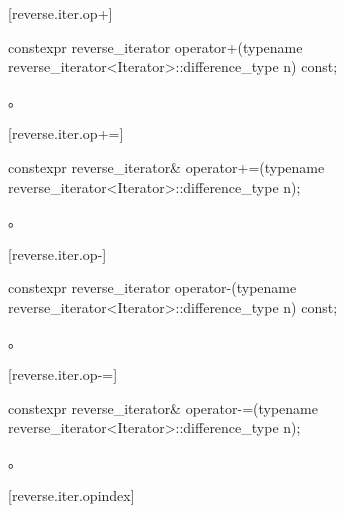 [reverse.iter.op+]{}

%
\begin{itemdecl}
constexpr reverse_iterator
operator+(typename reverse_iterator<Iterator>::difference_type n) const;
\end{itemdecl}

\begin{itemdescr}
\pnum
\returns
{}。
\end{itemdescr}

[reverse.iter.op+=]{}

%
\begin{itemdecl}
constexpr reverse_iterator&
operator+=(typename reverse_iterator<Iterator>::difference_type n);
\end{itemdecl}

\begin{itemdescr}
\pnum
\effects
{}

\pnum
\returns
{}。
\end{itemdescr}

[reverse.iter.op-]{}

%
\begin{itemdecl}
constexpr reverse_iterator
operator-(typename reverse_iterator<Iterator>::difference_type n) const;
\end{itemdecl}

\begin{itemdescr}
\pnum
\returns
{}。
\end{itemdescr}

[reverse.iter.op-=]{}

%
\begin{itemdecl}
constexpr reverse_iterator&
operator-=(typename reverse_iterator<Iterator>::difference_type n);
\end{itemdecl}

\begin{itemdescr}
\pnum
\effects
{}

\pnum
\returns
{}。
\end{itemdescr}

[reverse.iter.opindex]{}

